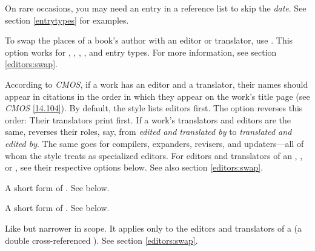 \documentclass[11pt,letterpaper,oneside]{article}
\begin{document}
\begin{optionlist}
\begin{refonly}
\nocite{darwin1964}
\end{refonly}


\noindent On rare occasions, you may need an entry in a reference list
to skip the \textit{date}. See section \ref{entrytypes} for examples.


\noindent To swap the places of a book's author with an editor or
translator, use . This option works for ,
, , , and
 entry types. For more information, see section
\ref{editors:swap}.


\noindent According to \textit{CMOS}, if a work has an editor and a
translator, their names should appear in citations in the order in
which they appear on the work's title page (see \textit{CMOS}
\ref{14.104}). By default, the style lists editors first. The option
 reverses this order: Their translators print
first. If a work's translators and editors are the same,
 reverses their roles, say, from \textit{edited
and translated by} to \textit{translated and edited by}. The same goes
for compilers, expanders, revisers, and updaters---all of whom the
style treats as specialized editors. For editors and translators of an
, , or , see
their respective options below. See also section \ref{editors:swap}.


A short form of . See below.


A short form of . See below.


Like  but narrower in scope. It applies only to the
editors and translators of a  (a double
cross-referenced ). See section \ref{editors:swap}.



\end{optionlist}
\end{document}
